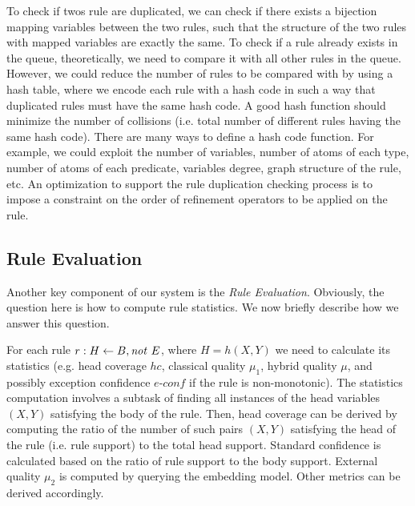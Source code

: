 To check if twos rule are duplicated, we can check if there exists a bijection mapping variables between the two rules, such that the structure of the two rules with mapped variables are exactly the same. To check if a rule already exists in the queue, theoretically, we need to compare it with all other rules in the queue. However, we could reduce the number of rules to be compared with by using a hash table, where we encode each rule with a hash code in such a way that duplicated rules must have the same hash code. A good hash function should minimize the number of collisions (i.e. total number of different rules having the same hash code). There are many ways to define a hash code function. For example, we could exploit the number of variables, number of atoms of each type, number of atoms of each predicate, variables degree, graph structure of the rule, etc. An optimization to support the rule duplication checking process is to impose a constraint on the order of refinement operators to be applied on the rule.


\subsection{Rule Evaluation}
\label{rule:eva}
Another key component of our system is the \textit{Rule Evaluation}. Obviously, the question here is how to compute rule statistics. We now briefly describe how we answer this question.

For each rule $r: H \leftarrow B, \mathit{not}~ E$, where $H = h(X,Y)$ we need to calculate its statistics (e.g. head coverage $hc$, classical quality $\mu_1$, hybrid quality $\mu$, and possibly exception confidence $\textit{e-conf}$ if the rule is non-monotonic). The statistics computation involves a subtask of finding all instances of the head variables $(X,Y)$ satisfying the body of the rule. Then, head coverage can be derived by computing the ratio of the number of such pairs $(X,Y)$ satisfying the head of the rule (i.e. rule support) to the total head support. Standard confidence is calculated based on the ratio of rule support to the body support. External quality $\mu_2$ is computed by querying the embedding model. Other metrics can be derived accordingly.


